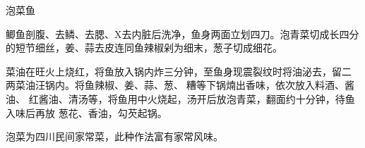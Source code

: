 \begin{recipe}{泡菜鱼}

\ingredients


\preparation

\step 鲫鱼剖腹、去鳞、去腮、X去内脏后洗净，鱼身两面立划四刀。泡青菜切成长四分
的短节细丝，姜、蒜去皮连同鱼辣椒剁为细末，葱子切成细花。

\step 菜油在旺火上烧红，将鱼放入锅内炸三分钟，至鱼身现震裂纹时将油泌去，留二
两菜油汪锅内。将鱼辣椒、姜、蒜、葱、𰪿糟等下锅煵出香味，依次放入料酒、酱油、
红酱油、清汤等，将鱼用中火烧起，汤开后放泡青菜，翻面约十分钟，待鱼入味后再放
葱花、香油，勾芡起锅。

\features

泡菜为四川民间家常菜，此种作法富有家常风味。

\end{recipe}


